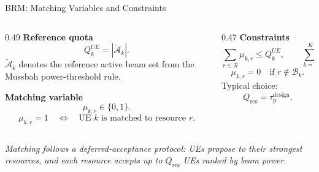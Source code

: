 \documentclass[10pt,aspectratio=169]{beamer}
\newcommand{\taudesign}{\tau_{\mathrm{p}}^{\mathrm{design}}}
\newcommand{\callout}[1]{%
    \vspace{0.3em}
    {\footnotesize\itshape #1}
}
\begin{document}
\begin{frame}{BRM: Matching Variables and Constraints}
    \small
    \begin{columns}[T,onlytextwidth]
        \begin{column}{0.49\textwidth}
            \textbf{Reference quota}
            \[
                Q_k^{UE}=|\widetilde{\mathcal{A}}_k|.
            \]
            \(\widetilde{\mathcal{A}}_k\) denotes the reference active beam set from the Mussbah power-threshold rule.
            
            \vspace{0.4em}
            \textbf{Matching variable}
            \[
                \mu_{k,r}\in\{0,1\}.
            \]
            \[
                \mu_{k,r}=1
                \quad \Longleftrightarrow \quad
                \text{UE }k\text{ is matched to resource }r.
            \]
        \end{column}
        \begin{column}{0.47\textwidth}
            \textbf{Constraints}
            \[
                \sum_{r\in\mathcal{R}}\mu_{k,r}
                \le Q_k^{UE},
                \qquad
                \sum_{k=1}^{K}\mu_{k,r}
                \le Q_{\mathrm{res}}.
            \]
            \[
                \mu_{k,r}=0
                \quad
                \text{if } r\notin \mathcal{B}_k.
            \]
            Typical choice:
            \[
                Q_{\mathrm{res}}=\taudesign.
            \]
        \end{column}
    \end{columns}
    
    \vspace{0.35em}
    \callout{Matching follows a deferred-acceptance protocol: UEs propose to their strongest resources, and each resource accepts up to \(Q_{\mathrm{res}}\) UEs ranked by beam power.}
\end{frame}
\end{document}
